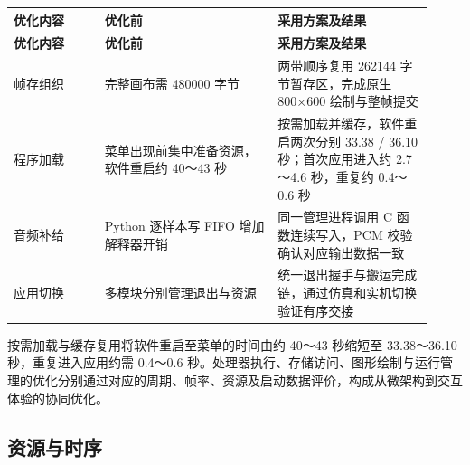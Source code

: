 \documentclass[UTF8,a4paper,12pt]{ctexart}
\begin{document}
{\small\setlength{\tabcolsep}{4pt}\renewcommand{\arraystretch}{1.3}

\begin{longtable}{>{\raggedright\arraybackslash}p{0.2\linewidth}>{\raggedright\arraybackslash}p{0.38\linewidth}>{\raggedright\arraybackslash}p{0.34\linewidth}}

\toprule

\textbf{优化内容} & \textbf{优化前} & \textbf{采用方案及结果} \\ \midrule

\endfirsthead

\toprule

\textbf{优化内容} & \textbf{优化前} & \textbf{采用方案及结果} \\ \midrule

\endhead

帧存组织 & 完整画布需 480000 字节 & 两带顺序复用 262144 字节暂存区，完成原生 800×600 绘制与整帧提交 \\

程序加载 & 菜单出现前集中准备资源，软件重启约 40～43 秒 & 按需加载并缓存，软件重启两次分别 33.38 / 36.10 秒；首次应用进入约 2.7～4.6 秒，重复约 0.4～0.6 秒 \\

音频补给 & Python 逐样本写 FIFO 增加解释器开销 & 同一管理进程调用 C 函数连续写入，PCM 校验确认对应输出数据一致 \\

应用切换 & 多模块分别管理退出与资源 & 统一退出握手与搬运完成链，通过仿真和实机切换验证有序交接 \\

\bottomrule

\end{longtable}

}

按需加载与缓存复用将软件重启至菜单的时间由约 40～43 秒缩短至 33.38～36.10 秒，重复进入应用约需 0.4～0.6 秒。处理器执行、存储访问、图形绘制与运行管理的优化分别通过对应的周期、帧率、资源及启动数据评价，构成从微架构到交互体验的协同优化。\par

\subsection{资源与时序}
\end{document}
